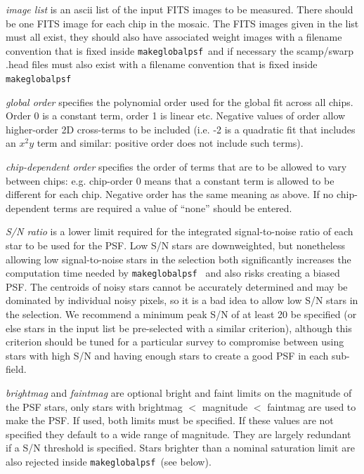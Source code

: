 \documentclass{article}
\def\makeglobalpsf{{\tt makeglobalpsf}\ }
\begin{document}
\begin{list}{}{\itemsep=0mm \leftmargin=5mm}
\item {\em image list} is an ascii list of the input FITS images to be measured. There should be one FITS image for 
each chip in the mosaic. The FITS images given in the list must all exist, they should also have associated weight images with a filename convention that is fixed inside \makeglobalpsf and if necessary the 
scamp/swarp .head files must also exist with a filename convention that is fixed inside \makeglobalpsf 
\item {\em global order} specifies the polynomial order used for the global fit across all chips. Order 0 is a constant 
term, order 1 is linear etc. Negative values of order allow higher-order 2D cross-terms to be included (i.e. -2 is a 
quadratic fit that includes an $x^2 y$ term and similar: positive order does not include such terms). 
\item
{\em chip-dependent order} 
specifies the order of terms that are to be allowed to vary between chips: e.g. chip-order 0 
means that a constant term is allowed to be different for each chip. Negative order has the same 
meaning as above. If no chip-dependent terms are required a value of ``none'' should be entered. 
\item
{\em S/N ratio} is a lower limit required for the integrated signal-to-noise ratio of each star to be used for 
the PSF. Low S/N stars are downweighted, but nonetheless
allowing low signal-to-noise stars in the selection both significantly increases the computation 
time needed by \makeglobalpsf 
and also risks creating a biased PSF. The centroids of noisy stars cannot 
be accurately determined and may be dominated by individual noisy pixels, so it is a bad idea to allow 
low S/N stars in the selection. We recommend a minimum peak S/N of at least 20 be specified 
(or else stars in the input list be pre-selected with a similar criterion), although this criterion should be 
tuned for a particular survey to compromise between using stars with high S/N and having enough stars 
to create a good PSF in each sub-field.  
\item
{\em brightmag} and {\em faintmag} are optional bright and faint limits on the magnitude of the 
PSF stars, only stars 
with brightmag $<$ magnitude $<$ faintmag are used to make the PSF. If used, both limits must be specified. 
If these values are not specified they default to a wide range of magnitude. They are largely redundant 
if a S/N threshold is specified. Stars brighter than a nominal saturation limit are also rejected inside 
\makeglobalpsf (see below). 
\end{list}
\end{document}
